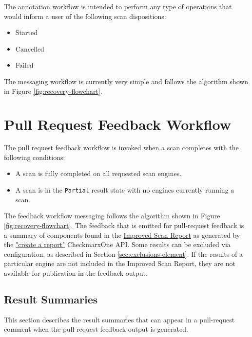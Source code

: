 The annotation workflow is intended to perform any type of operations that
would inform a user of the following scan dispositions:

\begin{itemize}
    \item Started
    \item Cancelled
    \item Failed
\end{itemize}

The messaging workflow is currently very simple and follows the algorithm
shown in Figure \ref{fig:recovery-flowchart}.

\section{Pull Request Feedback Workflow}\label{sec:pull-request-workflow}

The pull request feedback workflow is invoked when a scan completes with the
following conditions:

\begin{itemize}
    \item A scan is fully completed on all requested scan engines.
    \item A scan is in the \texttt{Partial} result state with no
    engines currently running a scan.
\end{itemize}

The feedback workflow messaging follows the algorithm shown in
Figure \ref{fig:recovery-flowchart}.  The feedback that is emitted
for pull-request feedback is a summary of components found in the
\href{https://docs.checkmarx.com/en/34965-182434-checkmarx-one-reporting.html}{Improved Scan Report}
as generated by the
\href{https://checkmarx.stoplight.io/docs/checkmarx-one-api-reference-guide/branches/main/7bf86350cfe72-create-a-report}{"create a report"}
CheckmarxOne API.  Some results can be excluded via configuration,
as described in Section \ref{sec:exclusions-element}.  If the results of a particular
engine are not included in the Improved Scan Report, they are not available for
publication in the feedback output.

\subsection{Result Summaries}

This section describes the result summaries that can appear in a pull-request
comment when the pull-request feedback output is generated.


